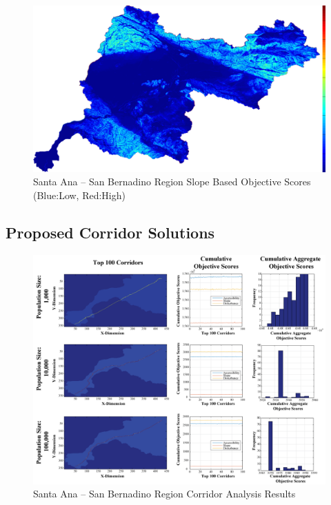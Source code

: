         \begin{figure}[!h]
            \begin{center}
            \includegraphics[width=5.5in]{figures/SanBernadino_SlopeScore.png}   
            \caption{Santa Ana -- San Bernadino Region Slope Based Objective Scores (Blue:Low, Red:High)}
            \label{fig:SASBslope}
            \end{center}
        \end{figure}
        
    \subsection{Proposed Corridor Solutions}
    
        \begin{figure}[!h]
            \begin{center}
            \includegraphics[width=6in]{figures/SanBernadino_PathwayResults.png}   
            \caption{Santa Ana -- San Bernadino Region Corridor Analysis Results}
            \label{fig:SASBresults}
            \end{center}
        \end{figure}

